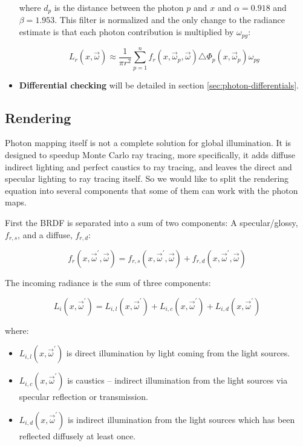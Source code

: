 \begin{itemize}
	where $d_p$ is the distance between the photon $p$ and $x$ and $\alpha = 0.918$ and $\beta = 1.953$. This filter is normalized and the only change to the radiance estimate is that each photon contribution is multiplied by $\omega_{pg}$:
	
	\begin{equation*}\label{e:approximated-radiance-area}
		L_r(x,\vec{\omega})\approx \frac{1}{\pi r^{2}}\sum^{n}_{p=1}f_r(x,\vec{\omega}_p,\vec{\omega})\triangle\Phi_p(x,\vec{\omega}_p)\omega_{pg}
	\end{equation*}
	
	\item \textbf{Differential checking} will be detailed in  section \ref{sec:photon-differentials}.
\end{itemize}





\subsection{Rendering}\label{sec:photon-mapping-rendering}
Photon mapping itself is not a complete solution for global illumination. It is designed to speedup Monte Carlo ray tracing, more specifically, it adds diffuse indirect lighting and perfect caustics to ray tracing, and leaves the direct and specular lighting to ray tracing itself. So we would like to split the rendering equation into several components that some of them can work with the photon maps. 

First the BRDF is separated into a sum of two components: A specular/glossy, $f_{r,s}$, and a diffuse, $f_{r,d}$:

\begin{equation*}
	f_r(x,\vec{\omega}^{'},\vec{\omega})=f_{r,s}(x,\vec{\omega}^{'},\vec{\omega})+f_{r,d}(x,\vec{\omega}^{'},\vec{\omega})
\end{equation*}

The incoming radiance is the sum of three components:

\begin{equation*}
	L_{i}(x,\vec{\omega}^{'})=L_{i,l}(x,\vec{\omega}^{'})+L_{i,c}(x,\vec{\omega}^{'})+L_{i,d}(x,\vec{\omega}^{'})
\end{equation*}

where:

\begin{itemize}
	\item $L_{i,l}(x,\vec{\omega}^{'})$ is direct illumination by light coming from the light sources.
	\item $L_{i,c}(x,\vec{\omega}^{'})$ is caustics -- indirect illumination from the light sources via specular reflection or transmission.
	\item $L_{i,d}(x,\vec{\omega}^{'})$ is indirect illumination from the light sources which has been reflected diffusely at least once.
\end{itemize}

